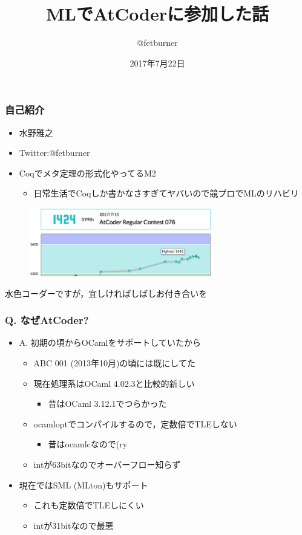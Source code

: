 \documentclass[dvipdfmx,cjk,xcolor=dvipsnames,envcountsect,notheorems,12pt]{beamer}
\title{MLでAtCoderに参加した話}
\author{@fetburner}
\date{2017年7月22日}
\theoremstyle{definition}
\begin{document}
\frame[plain]{\titlepage}%

\begin{frame}
	\frametitle{自己紹介}
	\begin{itemize}
		\item 水野雅之
		\item Twitter:@fetburner
		\item Coqでメタ定理の形式化やってるM2
			\begin{itemize}
				\item 日常生活でCoqしか書かなさすぎてヤバいので競プロでMLのリハビリ
			\end{itemize}
	\end{itemize}
	\begin{figure}[hb]
		\includegraphics[width=80mm]{./Rating.png}
	\end{figure}
	\begin{center}
		水色コーダーですが，宜しければしばしお付き合いを
	\end{center}
\end{frame}

\begin{frame}
	\frametitle{Q. なぜAtCoder?}
	\begin{itemize}
		\item A. 初期の頃からOCamlをサポートしていたから
			\begin{itemize}
				\item ABC 001 (2013年10月)の頃には既にしてた
				\item 現在処理系はOCaml 4.02.3と比較的新しい
					\begin{itemize}
						\item 昔はOCaml 3.12.1でつらかった
					\end{itemize}
				\item ocamloptでコンパイルするので，定数倍でTLEしない
					\begin{itemize}
						\item 昔はocamlcなので(ry
					\end{itemize}
				\item intが63bitなのでオーバーフロー知らず
			\end{itemize}
		\item 現在ではSML (MLton)もサポート
			\begin{itemize}
				\item これも定数倍でTLEしにくい
				\item intが31bitなので最悪
			\end{itemize}
	\end{itemize}
\end{frame}
\end{document}
